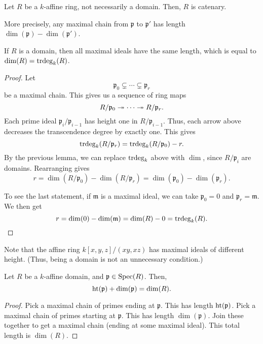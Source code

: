 \documentclass[12pt]{article}
\begin{document}
\begin{thm}
	Let $R$ be a $k$-affine ring, not necessarily a domain. Then, $R$ is catenary.

	More precisely, any maximal chain from $\mathfrak{p}$ to $\mathfrak{p}'$ has length $\dim(\mathfrak{p}) - \dim(\mathfrak{p}')$. 

	If $R$ is a domain, then all maximal ideals have the same length, which is equal to $\dim(R) = \operatorname{trdeg}_{k}(R)$.
\end{thm}
\begin{proof} 
	Let 
	\begin{equation*} 
		\mathfrak{p}_{0} \subsetneq \cdots \subsetneq \mathfrak{p}_{r}
	\end{equation*}
	be a maximal chain. This gives us a sequence of ring maps
	\begin{equation*} 
		R/\mathfrak{p}_{0} \twoheadrightarrow \cdots \twoheadrightarrow R/\mathfrak{p}_{r}.
	\end{equation*}
	Each prime ideal $\mathfrak{p}_{i}/\mathfrak{p}_{i - 1}$ has height one in $R/\mathfrak{p}_{i - 1}$. Thus, each arrow above decreases the transcendence degree by exactly one. \newline
	This gives 
	\begin{equation*} 
		\operatorname{trdeg}_{k}(R/\mathfrak{p}_{r}) = \operatorname{trdeg}_{k}(R/\mathfrak{p}_{0}) - r.
	\end{equation*}
	By the previous lemma, we can replace $\operatorname{trdeg}_{k}$ above with $\dim$, since $R/\mathfrak{p}_{i}$ are domains. Rearranging gives
	\begin{equation*} 
		r = \dim(R/\mathfrak{p}_{0}) - \dim(R/\mathfrak{p}_{r}) = \dim(\mathfrak{p}_{0}) - \dim(\mathfrak{p}_{r}).
	\end{equation*}

	To see the last statement, if $\mathfrak{m}$ is a maximal ideal, we can take $\mathfrak{p}_{0} = 0$ and $\mathfrak{p}_{r} = \mathfrak{m}$. We then get
	\begin{equation*} 
		r = \dim(0) - \dim(\mathfrak{m}) = \dim(R) - 0 = \operatorname{trdeg}_{k}(R). \qedhere
	\end{equation*}
\end{proof}

Note that the affine ring $k[x, y, z]/(xy, xz)$ has maximal ideals of different height. (Thus, being a domain is not an unnecessary condition.)

\begin{cor}
	Let $R$ be a $k$-affine domain, and $\mathfrak{p} \in \operatorname{Spec}(R)$. Then,
	\begin{equation*} 
		\operatorname{ht}(\mathfrak{p}) + \dim(\mathfrak{p}) = \dim(R).
	\end{equation*}
\end{cor}
\begin{proof} 
	Pick a maximal chain of primes ending at $\mathfrak{p}$. This has length $\operatorname{ht}(\mathfrak{p})$. \newline
	Pick a maximal chain of primes starting at $\mathfrak{p}$. This has length $\dim(\mathfrak{p})$. \newline
	Join these together to get a maximal chain (ending at some maximal ideal). This total length is $\dim(R)$.
\end{proof}
\end{document}
